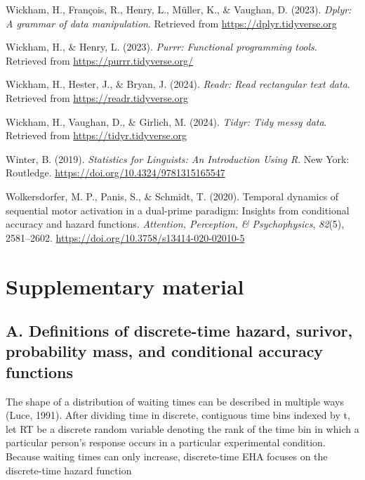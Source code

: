 \documentclass[
  man, donotrepeattitle,floatsintext]{apa6}
\newlength{\cslhangindent}
\newenvironment{CSLReferences}[2] %
 {\begin{list}{}{%
  \setlength{\itemindent}{0pt}
  \setlength{\leftmargin}{0pt}
  \setlength{\parsep}{0pt}
  \ifodd #1
   \setlength{\leftmargin}{\cslhangindent}
   \setlength{\itemindent}{-1\cslhangindent}
  \fi
  \setlength{\itemsep}{#2\baselineskip}}}
 {\end{list}}
\begin{document}
\begin{CSLReferences}{1}{0}
Wickham, H., François, R., Henry, L., Müller, K., \& Vaughan, D. (2023). \emph{Dplyr: A grammar of data manipulation}. Retrieved from \url{https://dplyr.tidyverse.org}

Wickham, H., \& Henry, L. (2023). \emph{Purrr: Functional programming tools}. Retrieved from \url{https://purrr.tidyverse.org/}

Wickham, H., Hester, J., \& Bryan, J. (2024). \emph{Readr: Read rectangular text data}. Retrieved from \url{https://readr.tidyverse.org}

Wickham, H., Vaughan, D., \& Girlich, M. (2024). \emph{Tidyr: Tidy messy data}. Retrieved from \url{https://tidyr.tidyverse.org}

Winter, B. (2019). \emph{Statistics for {Linguists}: {An Introduction Using R}}. New York: Routledge. \url{https://doi.org/10.4324/9781315165547}

Wolkersdorfer, M. P., Panis, S., \& Schmidt, T. (2020). Temporal dynamics of sequential motor activation in a dual-prime paradigm: {Insights} from conditional accuracy and hazard functions. \emph{Attention, Perception, \& Psychophysics}, \emph{82}(5), 2581--2602. \url{https://doi.org/10.3758/s13414-020-02010-5}

\end{CSLReferences}

\newpage

\section{Supplementary material}\label{supplementary-material}

\subsection{A. Definitions of discrete-time hazard, surivor, probability mass, and conditional accuracy functions}\label{a.-definitions-of-discrete-time-hazard-surivor-probability-mass-and-conditional-accuracy-functions}

The shape of a distribution of waiting times can be described in multiple ways (Luce, 1991). After dividing time in discrete, contiguous time bins indexed by t, let RT be a discrete random variable denoting the rank of the time bin in which a particular person's response occurs in a particular experimental condition.
Because waiting times can only increase, discrete-time EHA focuses on the discrete-time hazard function
\end{document}
